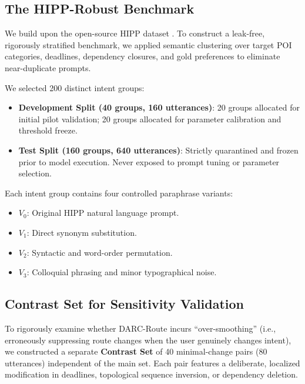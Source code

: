 \documentclass[conference]{IEEEtran}
\begin{document}
\subsection{The HIPP-Robust Benchmark}
We build upon the open-source HIPP dataset \cite{liang2025llmap}. To construct a leak-free, rigorously stratified benchmark, we applied semantic clustering over target POI categories, deadlines, dependency closures, and gold preferences to eliminate near-duplicate prompts. 

We selected 200 distinct intent groups:
\begin{itemize}
    \item \textbf{Development Split (40 groups, 160 utterances)}: 20 groups allocated for initial pilot validation; 20 groups allocated for parameter calibration and threshold freeze.
    \item \textbf{Test Split (160 groups, 640 utterances)}: Strictly quarantined and frozen prior to model execution. Never exposed to prompt tuning or parameter selection.
\end{itemize}
Each intent group contains four controlled paraphrase variants:
\begin{itemize}
    \item $V_0$: Original HIPP natural language prompt.
    \item $V_1$: Direct synonym substitution.
    \item $V_2$: Syntactic and word-order permutation.
    \item $V_3$: Colloquial phrasing and minor typographical noise.
\end{itemize}

\subsection{Contrast Set for Sensitivity Validation}
To rigorously examine whether DARC-Route incurs ``over-smoothing'' (i.e., erroneously suppressing route changes when the user genuinely changes intent), we constructed a separate \textbf{Contrast Set} of 40 minimal-change pairs (80 utterances) independent of the main set. Each pair features a deliberate, localized modification in deadlines, topological sequence inversion, or dependency deletion.
\end{document}
